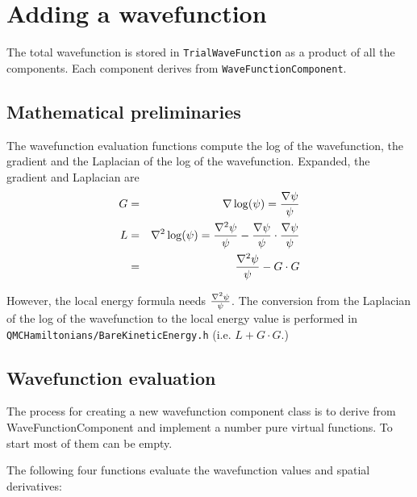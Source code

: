 \section{Adding a wavefunction}
\label{sec:adding_wavefunction}

The total wavefunction is stored in \texttt{TrialWaveFunction} as a product of all
the components.  Each component derives from \texttt{WaveFunctionComponent}.

\subsection{Mathematical preliminaries}

The wavefunction evaluation functions compute the log of the wavefunction,
the gradient and the Laplacian of the log of the wavefunction.
Expanded, the gradient and Laplacian are
\begin{eqnarray}
G &=& \grad \log(\psi) = \frac{\grad \psi}{\psi} \\
L &=& \lap \log(\psi) = \frac{\lap \psi}{\psi} - \frac{\grad \psi}{\psi} \cdot \frac{\grad \psi}{\psi} \\
                &=& \frac{\lap \psi}{\psi} - G \cdot G
\end{eqnarray}

However, the local energy formula needs $\frac{\lap \psi}{\psi}$.  The conversion from the Laplacian of the log of the wavefunction to the local energy value is performed
in \texttt{QMCHamiltonians/BareKineticEnergy.h} (i.e. $L + G \cdot G$.)


\subsection{Wavefunction evaluation}

The process for creating a new wavefunction component class is to derive
from WaveFunctionComponent and implement a number pure virtual functions.
To start most of them can be empty.

The following four functions evaluate the wavefunction values and spatial derivatives:

